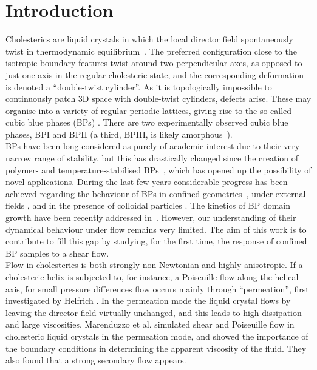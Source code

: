 \documentclass[12pt,twoside]{iopart}
\begin{document}
\section{Introduction}
Cholesterics are liquid crystals in which the local director field spontaneously twist in thermodynamic equilibrium~\cite{deGennes}.
The preferred configuration close to the isotropic boundary features twist around two perpendicular axes, as opposed to just one axis in the regular cholesteric state, and the corresponding deformation is denoted a ``double-twist cylinder''.
As it is topologically impossible to continuously patch 3D space with double-twist cylinders, defects arise. These may organise into a variety of regular periodic lattices, giving rise to the so-called cubic blue phases (BPs) \cite{Grebel:1984,Wright:1989}. There are two experimentally observed cubic blue phases, BPI and BPII (a third, BPIII, is likely amorphous~\cite{Henrich:2011a}).\\
BPs have been long considered as purely of academic interest due to their very narrow range of stability, but this has drastically changed since the creation of polymer- and temperature-stabilised BPs~\cite{Kikuchi:2002,Coles:2005}, which has opened up the possibility of novel applications.
During the last few years considerable progress has been achieved regarding the behaviour of BPs in confined geometries~\cite{Fukuda:2010a, Fukuda:2010b, Ravnik:2011b}, under external fields \cite{Alexander:2008,Fukuda:2009,Henrich:2010a,Castles:2010,Tiribocchi:2011}, and in the presence of colloidal particles \cite{Ravnik:2011a}. 
The kinetics of BP domain growth have been recently addressed in~\cite{Henrich:2010b}. However, our understanding of their dynamical behaviour under flow remains
very limited. The aim of this work is to contribute to fill this gap by studying, for the first time, the response of confined BP samples to a shear flow. \\
Flow in cholesterics is both strongly non-Newtonian and highly anisotropic. If a cholesteric helix is subjected to, for instance, a Poiseuille flow along the helical axis, for small pressure differences flow occurs mainly through ``permeation'', first investigated by Helfrich \cite{Helfrich:1969}. In the permeation mode the liquid crystal flows by leaving the director field virtually unchanged, and this leads to high dissipation and large viscosities. Marenduzzo et al. \cite{Marenduzzo:2006a,Marenduzzo:2006b} simulated shear and Poiseuille flow in cholesteric liquid crystals in the permeation mode, and showed the importance of the boundary conditions in determining the apparent viscosity of the fluid. They also found that a strong secondary flow appears.
\end{document}
